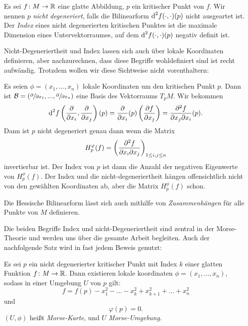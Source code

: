 \begin{definition}
    \label{def: nicht-degeneriert u index}
    Es sei $f \colon M \to { \mathbb R }$ eine glatte Abbildung, $p$ ein kritischer Punkt von
    $f$. Wir nennen $p$ \textit{nicht degeneriert}, falls die Bilinearform 
    ${ \operatorname{d} }^2 f (\cdot, \cdot) (p)$ nicht ausgeartet ist. Der \textit{Index} eines
    nicht degenerierten kritischen Punktes ist die maximale Dimension eines
    Untervektorraumes, auf dem ${ \operatorname{d} }^2 f (\cdot, \cdot) (p)$ negativ definit ist.
\end{definition}

\begin{remark}
    Nicht-Degeneriertheit und Index lassen sich auch über lokale Koordinaten definieren,
    aber nachzurechnen, dass diese Begriffe wohldefiniert sind ist recht aufwändig.
    Trotzdem wollen wir diese Sichtweise nicht vorenthaltern:

    Es seien $\phi = (x_1, ..., x_n)$ lokale Koordinaten um den kritischen Punkt $p$. 
    Dann ist $\mathcal{B} = \left(\pderive{x_1}, ..., \pderive{x_n}\right)$ eine Basis des
    Vektorraums $T_pM$. Wir bekommen
    \[ 
        \opd^2 f \left( \pderive{x_i}, \pderive{x_j} \right) (p) 
        = \pderive{x_i}(p) \left( \pderive[f]{x_j} \right) 
        = \pdderive[f]{x_j}{x_i} (p).
    \]
    Dann ist $p$ nicht degeneriert genau dann wenn die Matrix
    \[ H^\phi_p(f) = \left( \pdderive[f]{x_i}{x_j} \right)_{1 \leq i, j \leq n} \]
    invertierbar ist. Der Index von $p$ ist dann die Anzahl der negativen Eigenwerte
    von $H^\phi_p(f)$. Der Index und die nicht-degeneriertheit hängen offensichtlich
    nicht von den gewählten Koordinaten ab, aber die Matrix $H_p^{\phi}(f)$ schon.
\end{remark}

Die Hessische Bilinearform lässt sich auch mithilfe von \textit{Zusammenhängen} für 
alle Punkte von $M$ definieren.

\begin{remark}
    Die beiden Begriffe Index und nicht-Degeneriertheit sind zentral in der Morse-Theorie 
    und werden uns über die gesamte Arbeit begleiten. Auch der nachfolgende Satz wird in 
    fast jedem Beweis genutzt:
\end{remark}

\begin{theorem}
    \label{satz: morse-lemma}
    Es sei $p$ ein nicht degenerierter kritischer Punkt mit Index $k$ einer glatten 
    Funktion $f \colon M \to { \mathbb R }$. Dann existieren lokale koordinaten 
    $\phi = (x_1, ..., x_n)$, sodass in einer Umgebung $U$ von $p$ gilt:
    \[ f = f(p) - x_1^2 - ... - x_k^2 + x_{k + 1}^2 + ... + x_n^2 \]
    und 
    \[ \varphi (p) = 0. \]
    $(U, \phi)$ heißt \textit{Morse-Karte}, und $U$ \textit{Morse-Umgebung}.
\end{theorem}

